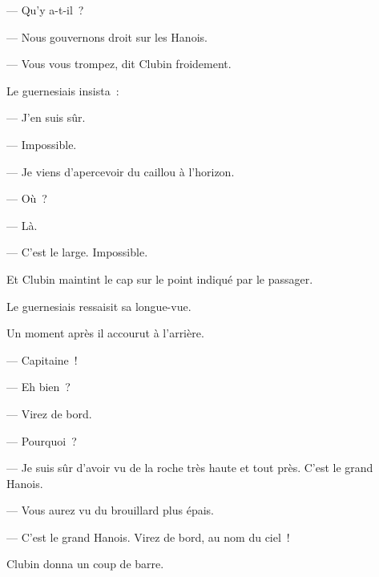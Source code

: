 \documentclass[french,twoside]{book} %
\begin{document}
— Qu’y a-t-il ?\par
— Nous gouvernons droit sur les Hanois.\par
— Vous vous trompez, dit Clubin froidement.\par
Le guernesiais insista :\par
— J’en suis sûr.\par
— Impossible.\par
— Je viens d’apercevoir du caillou à l’horizon.\par
— Où ?\par
— Là.\par
— C’est le large. Impossible.\par
Et Clubin maintint le cap sur le point indiqué par le passager.\par
 Le guernesiais ressaisit sa longue-vue.\par
Un moment après il accourut à l’arrière.\par
— Capitaine !\par
— Eh bien ?\par
— Virez de bord.\par
— Pourquoi ?\par
— Je suis sûr d’avoir vu de la roche très haute et tout près. C’est le grand Hanois.\par
— Vous aurez vu du brouillard plus épais.\par
— C’est le grand Hanois. Virez de bord, au nom du ciel !\par
Clubin donna un coup de barre.
\end{document}
